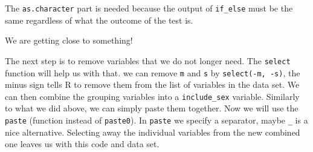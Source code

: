 \documentclass[
  11pt,
  letterpaper,
]{scrbook}
\begin{document}
The \texttt{as.character} part is needed because the output of
\texttt{if\_else} must be the same regardless of what the outcome of the
test is.

We are getting close to something!

The next step is to remove variables that we do not longer need. The
\texttt{select} function will help us with that. we can remove
\texttt{m} and \texttt{s} by \texttt{select(-m,\ -s)}, the minus sign
tells R to remove them from the list of variables in the data set. We
can then combine the grouping variables into a \texttt{include\_sex}
variable. Similarly to what we did above, we can simply paste them
together. Now we will use the \texttt{paste} (function instead of
\texttt{paste0}). In \texttt{paste} we specify a separator, maybe
\texttt{\_} is a nice alternative. Selecting away the individual
variables from the new combined one leaves us with this code and data
set.
\end{document}
